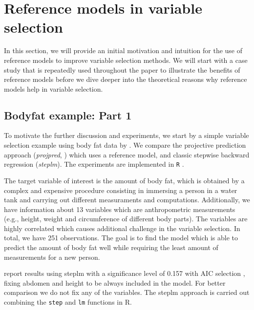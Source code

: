 \documentclass[a4]{article}
\let\rmarkdownfootnote\footnote%
\def\footnote{\protect\rmarkdownfootnote}
\theoremstyle{definition}
\begin{document}
\section{Reference models in variable selection}
\label{ref-intro}

In this section, we will provide an initial motivation and intuition 
for the use of reference models to improve variable selection methods.
We will start with a case study that is repeatedly used throughout
the paper to illustrate the benefits of reference models before we dive deeper
into the theoretical reasons why reference models help in variable selection.

\subsection{Bodyfat example: Part 1}
\label{bodyfat-1}

To motivate the further discussion and experiments, we start by a simple
variable selection example using body fat data by \citet{johnson1996fitting}.
We compare the projective prediction approach (\emph{projpred},
\citet{paper:projpred}) which uses a reference model, and classic
stepwise backward regression (\emph{steplm}).
The experiments are implemented in \texttt{R} \citep{Rcore2018}.

The target variable of interest is the amount of body fat, which is
obtained by a complex and expensive procedure consisting in immersing a 
person in a water tank and carrying out different measuraments and computations. 
Additionally, we have information about 13
variables which are anthropometric measurements (e.g., height, weight
and circumference of different body parts). The
variables are highly correlated which causes additional
challenge in the variable selection. In total, we have 251
observations. The goal is to find the model which is able to predict
the amount of body fat well while requiring the least amount of
measurements for a new person.

\cite{paper:bodyfat} report results using steplm with a significance
level of 0.157 with AIC selection \citep{akaike1974new}, fixing
abdomen and height to be always included in the model. For better
comparison we do not fix any of the variables.  The steplm approach is
carried out combining the \texttt{step} and \texttt{lm} functions in R.
\end{document}
